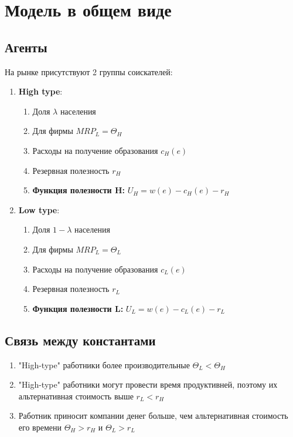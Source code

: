 \section{Модель в общем виде}
\subsection{Агенты}
\indent\setlength{\parindent}{1em}На рынке присутствуют 2 группы соискателей:
\begin{enumerate}
    \item \textbf{High type}: \begin{enumerate}
            \item Доля $\lambda$ населения
            \item Для фирмы $MRP_L=\Theta_H$
            \item Расходы на получение образования $c_H(e)$
            \item Резервная полезность $r_H$
            \item \textbf{Функция полезности H:} $U_H=w(e)-c_H(e)-r_H$
        \end{enumerate}
        \item \textbf{Low type}: \begin{enumerate}
            \item Доля $1-\lambda$ населения
            \item Для фирмы $MRP_L=\Theta_L$
            \item Расходы на получение образования $c_L(e)$
            \item Резервная полезность $r_L$
            \item \textbf{Функция полезности L:} $U_L=w(e)-c_L(e)-r_L$
        \end{enumerate}
\end{enumerate}
\subsection{Связь между константами}
\begin{enumerate}
    \item "High-type" работники более производительные $\Theta_L<\Theta_H$
    \item "High-type" работники могут провести время продуктивней, поэтому их альтернативная стоимость выше $r_L<r_H$
    \item Работник приносит компании денег больше, чем альтернативная стоимость его времени $\Theta_H>r_H$ и $\Theta_L>r_L$
\end{enumerate}
